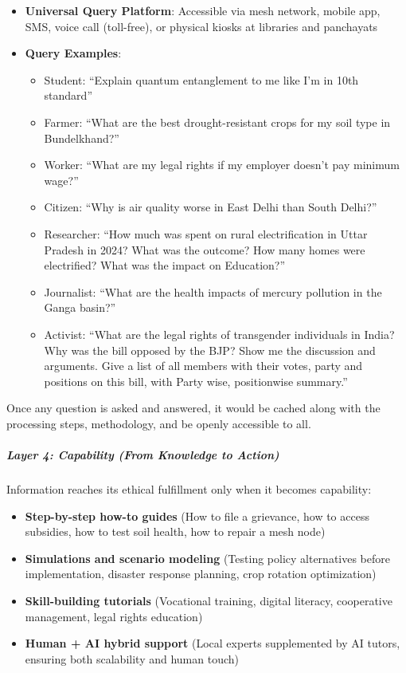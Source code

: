 \begin{itemize}
\tightlist
\item
  \textbf{Universal Query Platform}: Accessible via mesh network, mobile
  app, SMS, voice call (toll-free), or physical kiosks at libraries and
  panchayats
\item
  \textbf{Query Examples}:

  \begin{itemize}
  \tightlist
  \item
    Student: ``Explain quantum entanglement to me like I'm in 10th
    standard''
  \item
    Farmer: ``What are the best drought-resistant crops for my soil type
    in Bundelkhand?''
  \item
    Worker: ``What are my legal rights if my employer doesn't pay
    minimum wage?''
  \item
    Citizen: ``Why is air quality worse in East Delhi than South
    Delhi?''
  \item
    Researcher: ``How much was spent on rural electrification in Uttar
    Pradesh in 2024? What was the outcome? How many homes were
    electrified? What was the impact on Education?''
  \item
    Journalist: ``What are the health impacts of mercury pollution in
    the Ganga basin?''
  \item
    Activist: ``What are the legal rights of transgender individuals in
    India? Why was the bill opposed by the BJP? Show me the discussion
    and arguments. Give a list of all members with their votes, party
    and positions on this bill, with Party wise, positionwise summary.''
  \end{itemize}
\end{itemize}

Once any question is asked and answered, it would be cached along with
the processing steps, methodology, and be openly accessible to all.

\subparagraph{Layer 4: Capability (From Knowledge to
Action)}\label{layer-4-capability-from-knowledge-to-action}

Information reaches its ethical fulfillment only when it becomes
capability:

\begin{itemize}
\tightlist
\item
  \textbf{Step-by-step how-to guides} (How to file a grievance, how to
  access subsidies, how to test soil health, how to repair a mesh node)
\item
  \textbf{Simulations and scenario modeling} (Testing policy
  alternatives before implementation, disaster response planning, crop
  rotation optimization)
\item
  \textbf{Skill-building tutorials} (Vocational training, digital
  literacy, cooperative management, legal rights education)
\item
  \textbf{Human + AI hybrid support} (Local experts supplemented by AI
  tutors, ensuring both scalability and human touch)
\end{itemize}

